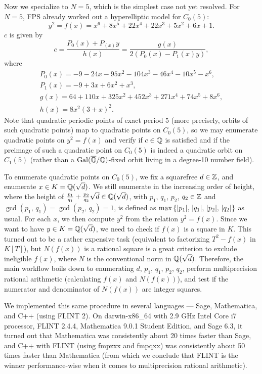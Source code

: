 Now we specialize to $N = 5$, which is the simplest case not yet
resolved. For $N = 5$, FPS already worked out a hyperelliptic model
for $C_0(5)$:
\[
y^2 = f(x) = x^6 + 8x^5 + 22x^4 + 22x^3 + 5x^2 + 6x + 1.
\]
$c$ is given by
\[
c = \frac{P_0(x) + P_(x) y}{h(x)} = \frac{g(x)}{2(P_0(x) - P_1(x) y)},
\]
where
\[
\begin{gathered}
  P_0(x) = - 9 - 24x - 95x^2 - 104x^3 - 46x^4 - 10x^5 - x^6,\\
  P_1(x) = - 9 + 3x + 6x^2 + x^3,\\
  g(x) = 64 + 110x + 325x^2 + 452x^3 + 271x^4 + 74x^5 + 8x^6,\\
  h(x) = 8x^2(3 + x)^2.
\end{gathered}
\]
Note that quadratic periodic points of exact period 5 (more precisely,
orbits of such quadratic points) map to quadratic points on $C_0(5)$,
so we may enumerate quadratic points on $y^2 = f(x)$ and verify if $c
\in \mathbb{Q}$ is satisfied and if the preimage of such a quadratic point on
$C_0(5)$ is indeed a quadratic orbit on $C_1(5)$ (rather than a
$\mathrm{Gal}(\overline{\mathbb{Q}}/\mathbb{Q})$-fixed orbit living in a degree-10 number field).

To enumerate quadratic points on $C_0(5)$, we fix a squarefree $d \in
\mathbb{Z}$, and enumerate $x \in K = \mathbb{Q}(\sqrt{d})$. We still enumerate in the
increasing order of height, where the height of $\frac{p_1}{q_1} +
\frac{p_2}{q_2} \sqrt{d} \in \mathbb{Q}(\sqrt{d})$, with $p_1$, $q_1$, $p_2$,
$q_2 \in \mathbb{Z}$ and $\gcd(p_1,\, q_1) = \gcd(p_2,\, q_2) = 1$, is defined
as $\max\left\{|p_1|,\, |q_1|,\, |p_2|,\, |q_2|\right\}$ as usual. For each
$x$, we then compute $y^2$ from the relation $y^2 = f(x)$. Since we
want to have $y \in K = \mathbb{Q}(\sqrt{d})$, we need to check if $f(x)$ is a
square in $K$. This turned out to be a rather expensive task
(equivalent to factorizing $T^2 - f(x)$ in $K[T]$), but $N(f(x))$ is a
rational square is a great criterion to exclude ineligible $f(x)$,
where $N$ is the conventional norm in $\mathbb{Q}(\sqrt{d})$. Therefore, the
main workflow boils down to enumerating $d$, $p_1$, $q_1$, $p_2$,
$q_2$, perform multiprecision rational arithmetic (calculating $f(x)$
and $N(f(x))$), and test if the numerator and denominator of $N(f(x))$
are integer squares.

We implemented this same procedure in several languages --- Sage,
Mathematica, and C++ (using FLINT 2). On darwin-x86\_64 with 2.9 GHz
Intel Core i7 processor, FLINT 2.4.4, Mathematica 9.0.1 Student
Edition, and Sage 6.3, it turned out that Mathematica was consistently
about 20 times faster than Sage, and C++ with FLINT (using fmpzxx and
fmpqxx) was consistently about 50 times faster than Mathematica (from
which we conclude that FLINT is the winner performance-wise when it
comes to multiprecision rational arithmetic).

